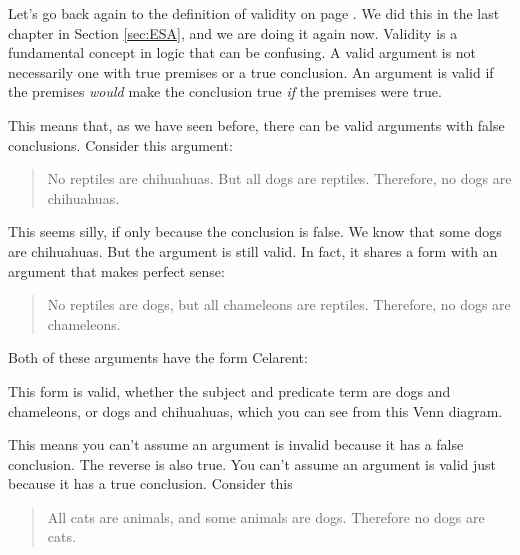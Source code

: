 Let's go back again to the definition of validity on page \pageref{def:valid}. We did this in the last chapter in Section \ref{sec:ESA}, and we are doing it again now. \label{valid_definition_reinforcement} Validity is a fundamental concept in logic that can be confusing. A valid argument is not necessarily one with true premises or a true conclusion. An argument is valid if the premises \emph{would} make the conclusion true \emph{if} the premises were true.

This means that, as we have seen before, there can be valid arguments with false conclusions. Consider this argument:

\begin{quotation}\noindent No reptiles are chihuahuas. But all dogs are reptiles. Therefore, no dogs are chihuahuas. \end{quotation}

This seems silly, if only because the conclusion is false. We know that some dogs are chihuahuas. But the argument is still valid. In fact, it shares a form with an argument that makes perfect sense:

\begin{quotation}\noindent No reptiles are dogs, but all chameleons are reptiles. Therefore, no dogs are chameleons. \end{quotation}

Both of these arguments have the form Celarent:

\begin{kormanize}
\end{kormanize}

This form is valid, whether the subject and predicate term are dogs and chameleons, or dogs and chihuahuas, which you can see from this Venn diagram.



This means you can't assume an argument is invalid because it has a false conclusion. The reverse is also true. You can't assume an argument is valid just because it has a true conclusion. Consider this

\begin{quotation}  All cats are animals, and some animals are dogs. Therefore no dogs are cats. \end{quotation}

